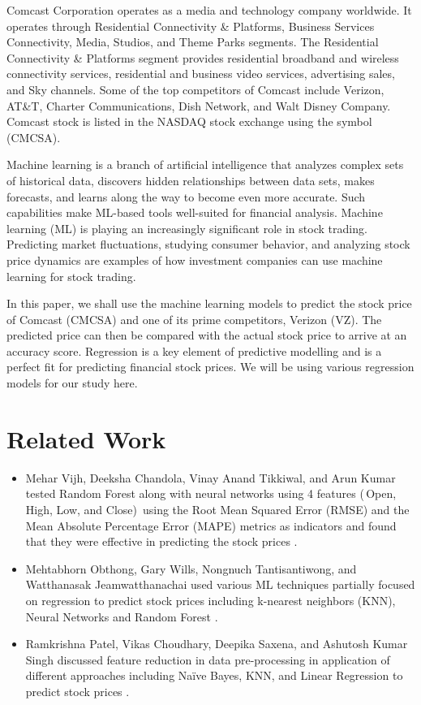 \documentclass[conference]{IEEEtran}
\begin{document}
Comcast Corporation operates as a media and technology company worldwide.
It operates through Residential Connectivity \& Platforms, Business Services Connectivity, Media, Studios, and Theme Parks segments.
The Residential Connectivity \& Platforms segment provides residential broadband and wireless connectivity services, residential and business video services, advertising sales, and Sky channels. Some of the top competitors of Comcast include Verizon, AT\&T, Charter Communications, Dish Network, and Walt Disney Company.
Comcast stock is listed in the NASDAQ stock exchange using the symbol (CMCSA).\par
Machine learning is a branch of artificial intelligence that analyzes complex sets of historical data, discovers hidden relationships between data sets, makes forecasts, and learns along the way to become even more accurate.
Such capabilities make ML-based tools well-suited for financial analysis.
Machine learning (ML) is playing an increasingly significant role in stock trading.
Predicting market fluctuations, studying consumer behavior, and analyzing stock price dynamics are examples of how investment companies can use machine learning for stock trading.\par
In this paper, we shall use the machine learning models to predict the stock price of Comcast (CMCSA) and one of its prime competitors, Verizon (VZ).
The predicted price can then be compared with the actual stock price to arrive at an accuracy score. Regression is a key element of predictive modelling and is a perfect fit for predicting financial stock prices.
We will be using various regression models for our study here.

\section{Related Work}

\begin{itemize}
    \item Mehar Vijh, Deeksha Chandola, Vinay Anand Tikkiwal, and Arun Kumar tested Random Forest along with neural networks using 4 features (\,Open, High, Low, and Close)\, using the Root Mean Squared Error (RMSE) and the Mean Absolute Percentage Error (MAPE) metrics as indicators and found that they were effective in predicting the stock prices \cite{b3}.
    \item Mehtabhorn Obthong, Gary Wills, Nongnuch Tantisantiwong, and Watthanasak Jeamwatthanachai used various ML techniques partially focused on regression to predict stock prices including k-nearest neighbors (KNN), Neural Networks and Random Forest \cite{b4}.
    \item Ramkrishna Patel, Vikas Choudhary, Deepika Saxena, and Ashutosh Kumar Singh discussed feature reduction in data pre-processing in application of different approaches including Naïve Bayes, KNN, and Linear Regression to predict stock prices \cite{b5}.
\end{itemize}
\end{document}
